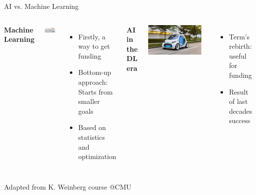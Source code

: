 \documentclass[aspectratio=169,10pt]{beamer}
\begin{document}
\begin{frame}{AI vs. Machine Learning}
\begin{columns}[t]
		\begin{center}\textbf{Machine Learning}\end{center}
			\includegraphics[width=0.9\textwidth, clip]{images/ml_simple}\\
		\begin{itemize}
			\item Firstly, a way to get funding
			\item Bottom-up approach: Starts from smaller goals
			\item Based on statistics and optimization
		\end{itemize}
	\begin{center}\textbf{AI in the DL era}\end{center}
	\includegraphics[width=0.9\textwidth, clip]{images/vehicle}\\
	\begin{itemize}
		\item Term's rebirth: useful for funding 
		\item Result of last decades success
	\end{itemize}
	\end{columns}
\vspace{0.3cm}
{\tiny Adapted from K. Weinberg course @CMU}
\end{frame}
\end{document}
